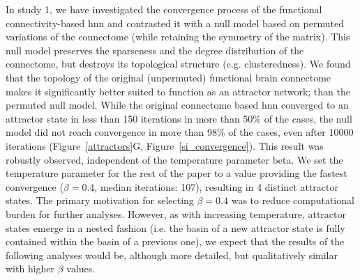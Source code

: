 \documentclass{article}
\begin{document}
In study 1, we have investigated the convergence process of the functional connectivity-based \acrshort{hnn} and contrasted it with a null model based on permuted variations of the connectome (while retaining the symmetry of the matrix). This null model preserves the sparseness and the degree distribution of the connectome, but destroys its topological structure (e.g. clusteredness). We found that the topology of the original (unpermuted) functional brain connectome makes it significantly better suited to function as an attractor network; than the permuted null model.
While the original connectome based \acrshort{hnn} converged to an attractor state in less than 150 iterations in more than 50\% of the cases, the null model did not reach convergence in more than 98\% of the cases, even after 10000 iterations (Figure~\ref{attractors}G, Figure~\ref{si_convergence}). This result was robustly observed, independent of the temperature parameter beta.
We set the temperature parameter for the rest of the paper to a value providing the fastest convergence ($\beta=0.4$, median iterations: 107), resulting in 4 distinct attractor states. The primary motivation for selecting $\beta=0.4$ was to reduce computational burden for further analyses. However, as with increasing temperature, attractor states emerge in a nested fashion (i.e. the basin of a new attractor state is fully contained within the basin of a previous one), we expect that the results of the following analyses would be, although more detailed, but qualitatively similar with higher $\beta$ values.
\end{document}
